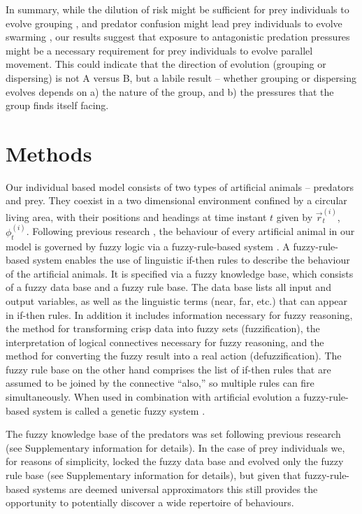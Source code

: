 In summary, while the dilution of risk might be sufficient for prey individuals to evolve grouping \cite{biswas2014causes}, and predator confusion might lead prey individuals to evolve swarming \cite{kunz2006prey,olson2013predator,olson2016evolution}, our results suggest that exposure to antagonistic predation pressures might be a necessary requirement for prey individuals to evolve parallel movement. This could indicate that the direction of evolution (grouping or dispersing) is not A versus B, but a labile result -- whether grouping or dispersing evolves depends on a) the nature of the group, and b) the pressures that the group finds itself facing.

\section{Methods}

Our individual based model consists of two types of artificial animals -- predators and prey. They coexist in a two dimensional environment confined by a circular living area, with their positions and headings at time instant $t$ given by $\vec{r}^{(i)}_t$, $\phi^{(i)}_t$. Following previous research \cite{dellorco2014simulation,demsar2014simulated,lebarbajec2005simulating,lucic2002transportation,tron2004mathematical}, the behaviour of every artificial animal in our model is governed by fuzzy logic \cite{zadeh1965fuzzy} via a fuzzy-rule-based system \cite{mamdani1974application}. A fuzzy-rule-based system enables the use of linguistic if-then rules to describe the behaviour of the artificial animals. It is specified via a fuzzy knowledge base, which consists of a fuzzy data base and a fuzzy rule base. The data base lists all input and output variables, as well as the linguistic terms (\eg near, far, etc.) that can appear in if-then rules. In addition it includes information necessary for fuzzy reasoning, \ie the method for transforming crisp data into fuzzy sets (fuzzification), the interpretation of logical connectives necessary for fuzzy reasoning, and the method for converting the fuzzy result into a real action (defuzzification). The fuzzy rule base on the other hand comprises the list of if-then rules that are assumed to be joined by the connective ``also,'' so multiple rules can fire simultaneously. When used in combination with artificial evolution a fuzzy-rule-based system is called a genetic fuzzy system \cite{cordon2004ten,fernandez2015revisiting,herrera2008genetic}.

The fuzzy knowledge base of the predators was set following previous research \cite{demsar2014simulated} (see Supplementary information for details). In the case of prey individuals we, for reasons of simplicity, locked the fuzzy data base and evolved only the fuzzy rule base (see Supplementary information for details), but given that fuzzy-rule-based systems are deemed universal approximators \cite{castro1995fuzzy} this still provides the opportunity to potentially discover a wide repertoire of behaviours.

